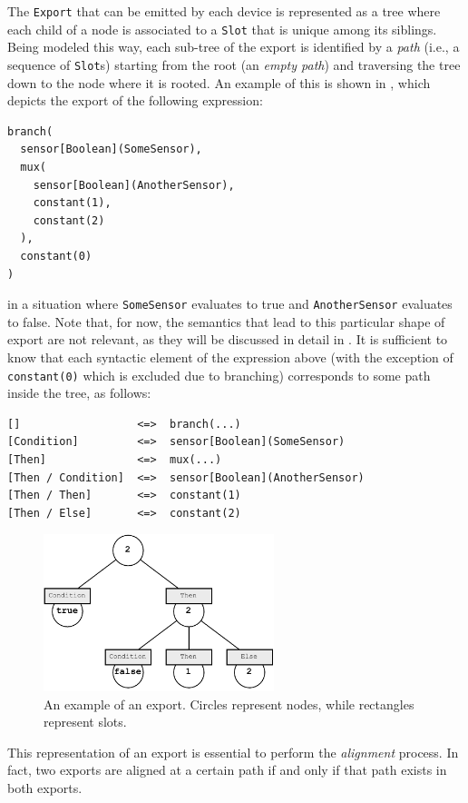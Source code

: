 The \texttt{Export} that can be emitted by each device is represented as a tree where each child of a node is associated to a \texttt{Slot} that is unique among its siblings.
%
Being modeled this way, each sub-tree of the export is identified by a \textit{path} (i.e., a sequence of \texttt{Slot}s) starting from the root (an \textit{empty path}) and traversing the tree down to the node where it is rooted.
%
An example of this is shown in , which depicts the export of the following expression:
%
\begin{lstlisting}[frame=single]
branch(
  sensor[Boolean](SomeSensor),
  mux(
    sensor[Boolean](AnotherSensor),
    constant(1),
    constant(2)
  ),
  constant(0)
)
\end{lstlisting}
%
in a situation where \texttt{SomeSensor} evaluates to true and \texttt{AnotherSensor} evaluates to false.
%
Note that, for now, the semantics that lead to this particular shape of export are not relevant, as they will be discussed in detail in .
%
It is sufficient to know that each syntactic element of the expression above (with the exception of \texttt{constant(0)} which is excluded due to branching) corresponds to some path inside the tree, as follows:
%
\begin{verbatim}
[]                  <=>  branch(...)
[Condition]         <=>  sensor[Boolean](SomeSensor)
[Then]              <=>  mux(...)
[Then / Condition]  <=>  sensor[Boolean](AnotherSensor)
[Then / Then]       <=>  constant(1)
[Then / Else]       <=>  constant(2)
\end{verbatim}
%
\begin{figure}
    \centering
    \includegraphics[width=0.6\textwidth]{figures/export-example.pdf}
    \caption{An example of an export. Circles represent nodes, while rectangles represent slots.}
    \label{fig:export-example}
\end{figure}
%
This representation of an export is essential to perform the \textit{alignment} process.
%
In fact, two exports are aligned at a certain path if and only if that path exists in both exports.

